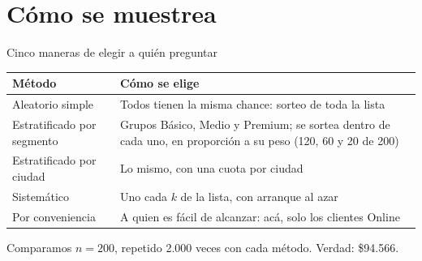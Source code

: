 \documentclass[aspectratio=169,10pt]{beamer}
\begin{document}
\section{Cómo se muestrea}

\begin{frame}{Cinco maneras de elegir a quién preguntar}
\small
\begin{center}
\begin{tabular}{@{}lp{6.2cm}@{}}
\toprule
\textbf{Método} & \textbf{Cómo se elige} \\
\midrule
Aleatorio simple & Todos tienen la misma chance: sorteo de toda la lista \\
Estratificado por segmento & Grupos Básico, Medio y Premium; se sortea dentro de cada uno, en proporción a su peso (120, 60 y 20 de 200) \\
Estratificado por ciudad & Lo mismo, con una cuota por ciudad \\
Sistemático & Uno cada $k$ de la lista, con arranque al azar \\
Por conveniencia & A quien es fácil de alcanzar: acá, solo los clientes Online \\
\bottomrule
\end{tabular}
\end{center}
\vspace{0.1cm}
\small Comparamos $n=200$, repetido 2.000 veces con cada método. Verdad: \$94.566.
\end{frame}
\end{document}
